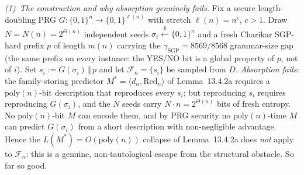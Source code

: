 \documentclass[
]{article}
\begin{document}
\emph{(1)~The construction and why absorption genuinely fails.}
Fix a secure length-doubling PRG $G:\{0,1\}^n \to \{0,1\}^{\ell(n)}$
with stretch $\ell(n)=n^{c}$, $c>1$. Draw $N=N(n)=2^{\Theta(n)}$
independent seeds $\sigma_i \stackrel{\$}{\leftarrow}\{0,1\}^n$ and a
fresh Charikar SGP-hard prefix $p$ of length $m(n)$ carrying the
$\gamma_{\mathrm{SGP}}=8569/8568$ grammar-size gap (the same prefix on
every instance: the YES/NO bit is a global property of $p$, not of
$i$). Set $s_i := G(\sigma_i)\,\Vert\,p$ and let $\mathcal{F}_n=\{s_i\}$
be sampled from $D$. \emph{Absorption fails:} the family-storing
predictor $M^*=\langle d_n,\mathrm{Red}_n\rangle$ of Lemma~13.4.2a
requires a $\mathrm{poly}(n)$-bit description that reproduces every
$s_i$; but reproducing $s_i$ requires reproducing $G(\sigma_i)$, and
the $N$ seeds carry $N\cdot n = 2^{\Theta(n)}$ bits of fresh entropy.
No $\mathrm{poly}(n)$-bit $M$ can encode them, and by PRG security no
$\mathrm{poly}(n)$-time $M$ can predict $G(\sigma_i)$ from a short
description with non-negligible advantage. Hence the
$L(M^*)=O(\mathrm{poly}(n))$ collapse of Lemma~13.4.2a does
\emph{not} apply to $\mathcal{F}_n$: this is a genuine,
non-tautological escape from the structural obstacle. So far so good.
\end{document}
